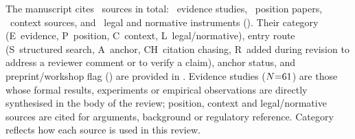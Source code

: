 The manuscript cites \Ncited~sources in total: \Nevidence~evidence studies,
\Nposition~position papers, \Ncontext~context sources, and \Nlegal~legal
and normative instruments (\SuppStudies).
Their category (E~evidence, P~position, C~context, L~legal/normative), entry route
(S~structured search, A~anchor, CH~citation chasing,
R~added during revision to address a reviewer comment or to verify a claim),
anchor status, and preprint/workshop flag (\dag) are provided in
\SuppStudies.
Evidence studies ($N{=}61{}$) are those whose formal results, experiments or
empirical observations are directly synthesised in the body of the review;
position, context and legal/normative sources are cited for arguments, background or regulatory reference.
Category reflects how each source is used in this review.

